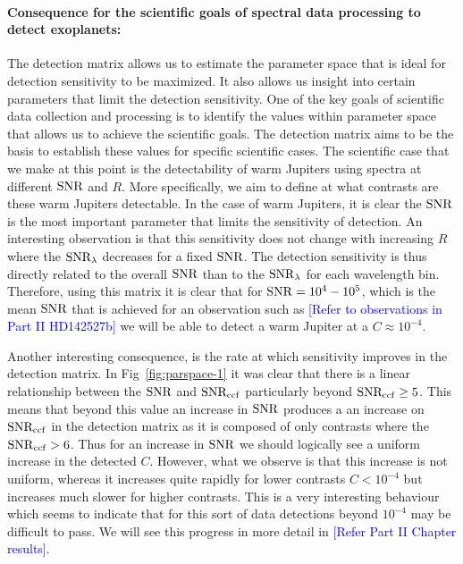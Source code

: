 \paragraph{Consequence for the scientific goals of spectral data processing to detect exoplanets:\\}
The detection matrix allows us to estimate the parameter space that is ideal for detection sensitivity to be maximized.
It also allows us insight into certain parameters that limit the detection sensitivity.
One of the key goals of scientific data collection and processing is to identify the values within parameter space that allows us to achieve the scientific goals.
The detection matrix aims to be the basis to establish these values for specific scientific cases.
The scientific case that we make at this point is the detectability of warm Jupiters using spectra at different $\rm{SNR}$ and $R$.
More specifically, we aim to define at what contrasts are these warm Jupiters detectable.
In the case of warm Jupiters, it is clear the $\rm{SNR}$ is the most important parameter that limits the sensitivity of detection.
An interesting observation is that this sensitivity does not change with increasing $R$ where the $\rm{SNR_{\lambda}}$ decreases for a fixed $\rm{SNR}$.
The detection sensitivity is thus directly related to the overall $\rm{SNR}$ than to the $\rm{SNR}_\lambda$ for each wavelength bin.
Therefore, using this matrix it is clear that for $\rm{SNR}=10^{4}- 10^{5}$, which is the mean $\rm{SNR}$ that is achieved for an observation such as \textcolor{blue}{[Refer to observations in Part II HD142527b]} we will be able to detect a warm Jupiter at a $C\approx 10^{-4}$.

Another interesting consequence, is the rate at which sensitivity improves in the detection matrix.
In Fig~\ref{fig:parspace-1} it was clear that there is a linear relationship between the $\rm{SNR}$ and $\rm{SNR_{ccf}}$ particularly beyond $\rm{SNR_{ccf}}\ge 5$.
This means that beyond this value an increase in $\rm{SNR}$ produces a an increase on $\rm{SNR_{ccf}}$ in the detection matrix as it is composed of only contrasts where the $\rm{SNR}_{ccf}>6$.
Thus for an increase in $\rm{SNR}$ we should logically see a uniform increase in the detected $C$. However, what we observe is that this increase is not uniform, whereas it increases quite rapidly for lower contrasts $C<10^{-4}$ but increases much slower for higher contrasts.
This is a very interesting behaviour which seems to indicate that for this sort of data detections beyond $10^{-4}$ may be difficult to pass.
We will see this progress in more detail in \textcolor{blue}{[Refer Part II Chapter results]}.

